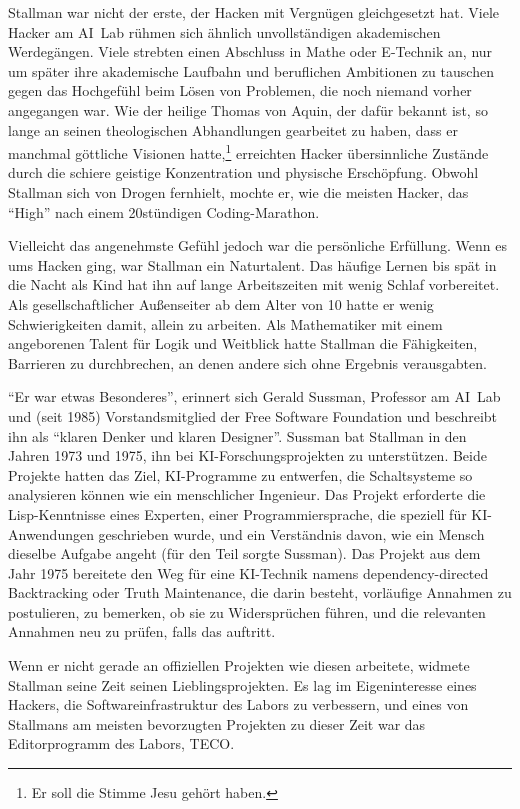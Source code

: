 Stallman war nicht der erste, der Hacken mit Vergnügen gleichgesetzt hat. Viele Hacker am AI~Lab rühmen sich ähnlich unvollständigen akademischen Werdegängen. Viele strebten einen Abschluss in Mathe oder E-Technik an, nur um später ihre akademische Laufbahn und beruflichen Ambitionen zu tauschen gegen das Hochgefühl beim Lösen von Problemen, die noch niemand vorher angegangen war. Wie der heilige Thomas von Aquin, der dafür bekannt ist, so lange an seinen theologischen Abhandlungen gearbeitet zu haben, dass er manchmal göttliche Visionen hatte,\footnote{Er soll die Stimme Jesu gehört haben.} erreichten Hacker übersinnliche Zustände durch die schiere geistige Konzentration und physische Erschöpfung. Obwohl Stallman sich von Drogen fernhielt, mochte er, wie die meisten Hacker, das "`High"' nach einem 20stündigen Coding-Marathon.

Vielleicht das angenehmste Gefühl jedoch war die persönliche Erfüllung. Wenn es ums Hacken ging, war Stallman ein Naturtalent. Das häufige Lernen bis spät in die Nacht als Kind hat ihn auf lange Arbeitszeiten mit wenig Schlaf vorbereitet. Als gesellschaftlicher Außenseiter ab dem Alter von 10 hatte er wenig Schwierigkeiten damit, allein zu arbeiten. Als Mathematiker mit einem angeborenen Talent für Logik und Weitblick hatte Stallman die Fähigkeiten, Barrieren zu durchbrechen, an denen andere sich ohne Ergebnis verausgabten.

"`Er war etwas Besonderes"', erinnert sich Gerald Sussman, Professor am AI~Lab und (seit 1985) Vorstandsmitglied der Free Software Foundation und beschreibt ihn als "`klaren Denker und klaren Designer"'. Sussman bat Stallman in den Jahren 1973 und 1975, ihn bei KI-Forschungsprojekten zu unterstützen. Beide Projekte hatten das Ziel, KI-Programme zu entwerfen, die Schaltsysteme so analysieren können wie ein menschlicher Ingenieur. Das Projekt erforderte die Lisp-Kenntnisse eines Experten, einer Programmiersprache, die speziell für KI-Anwendungen geschrieben wurde, und ein Verständnis davon, wie ein Mensch dieselbe Aufgabe angeht (für den Teil sorgte Sussman). Das Projekt aus dem Jahr 1975 bereitete den Weg für eine KI-Technik namens dependency-directed Backtracking oder Truth Maintenance, die darin besteht, vorläufige Annahmen zu postulieren, zu bemerken, ob sie zu Widersprüchen führen, und die relevanten Annahmen neu zu prüfen, falls das auftritt.

Wenn er nicht gerade an offiziellen Projekten wie diesen arbeitete, widmete Stallman seine Zeit seinen Lieblingsprojekten. Es lag im Eigeninteresse eines Hackers, die Softwareinfrastruktur des Labors zu verbessern, und eines von Stallmans am meisten bevorzugten Projekten zu dieser Zeit war das Editorprogramm des Labors, TECO.

